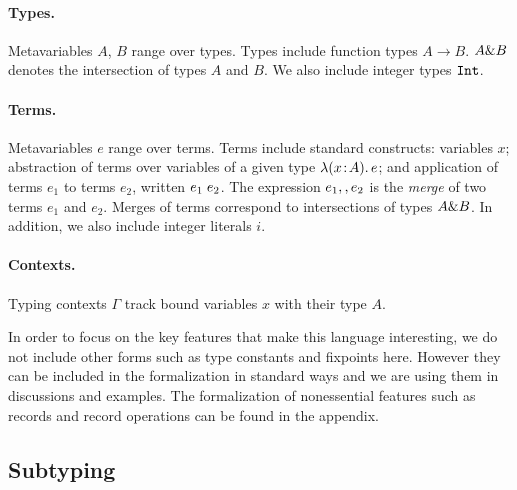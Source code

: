 \paragraph{Types.} Metavariables $A$, $B$ range over types. Types include
function types $A \to B$. $A \& B$ denotes the intersection of types $A$ and
$B$. We also include integer types $\texttt{Int}$.

\paragraph{Terms.} Metavariables $e$ range over terms.  Terms include standard
constructs: variables $x$; abstraction of terms over variables of a given type
$\lambda (x \!:\! A).\, e$; and application of terms $e_1$ to terms $e_2$, written $e_1 \; e_2$. The expression $e_1 ,, e_2$ is the \emph{merge} of two terms
$e_1$ and $e_2$. Merges of terms correspond to intersections of types $A \&
B$. In addition, we also include integer literals $i$.

\paragraph{Contexts.} Typing contexts $ \Gamma $ track bound variables $x$ with their type $A$.


In order to focus on the key features that make this language interesting, we do
not include other forms such as type constants and fixpoints here. However they
can be included in the formalization in standard ways and we are using them in
discussions and examples. The formalization of nonessential features such as
records and record operations can be found in the appendix.


\subsection{Subtyping}

